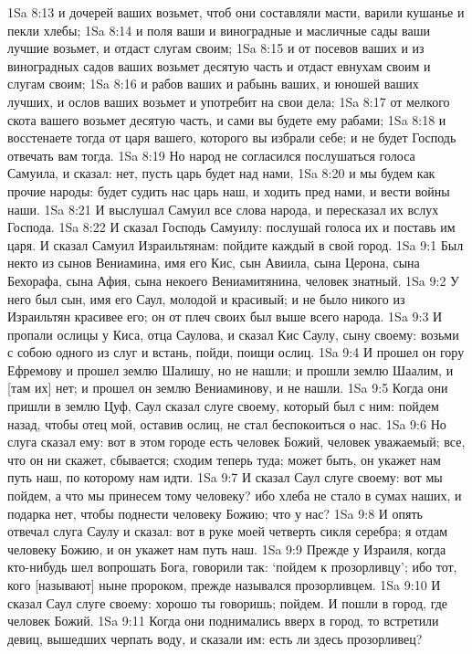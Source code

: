 1Sa 8:13  и дочерей ваших возьмет, чтоб они составляли масти, варили кушанье и пекли хлебы;
1Sa 8:14  и поля ваши и виноградные и масличные сады ваши лучшие возьмет, и отдаст слугам своим;
1Sa 8:15  и от посевов ваших и из виноградных садов ваших возьмет десятую часть и отдаст евнухам своим и слугам своим;
1Sa 8:16  и рабов ваших и рабынь ваших, и юношей ваших лучших, и ослов ваших возьмет и употребит на свои дела;
1Sa 8:17  от мелкого скота вашего возьмет десятую часть, и сами вы будете ему рабами;
1Sa 8:18  и восстенаете тогда от царя вашего, которого вы избрали себе; и не будет Господь отвечать вам тогда.
1Sa 8:19  Но народ не согласился послушаться голоса Самуила, и сказал: нет, пусть царь будет над нами,
1Sa 8:20  и мы будем как прочие народы: будет судить нас царь наш, и ходить пред нами, и вести войны наши.
1Sa 8:21  И выслушал Самуил все слова народа, и пересказал их вслух Господа.
1Sa 8:22  И сказал Господь Самуилу: послушай голоса их и поставь им царя. И сказал Самуил Израильтянам: пойдите каждый в свой город.
1Sa 9:1  Был некто из сынов Вениамина, имя его Кис, сын Авиила, сына Церона, сына Бехорафа, сына Афия, сына некоего Вениамитянина, человек знатный.
1Sa 9:2  У него был сын, имя его Саул, молодой и красивый; и не было никого из Израильтян красивее его; он от плеч своих был выше всего народа.
1Sa 9:3  И пропали ослицы у Киса, отца Саулова, и сказал Кис Саулу, сыну своему: возьми с собою одного из слуг и встань, пойди, поищи ослиц.
1Sa 9:4  И прошел он гору Ефремову и прошел землю Шалишу, но не нашли; и прошли землю Шаалим, и [там их] нет; и прошел он землю Вениаминову, и не нашли.
1Sa 9:5  Когда они пришли в землю Цуф, Саул сказал слуге своему, который был с ним: пойдем назад, чтобы отец мой, оставив ослиц, не стал беспокоиться о нас.
1Sa 9:6  Но слуга сказал ему: вот в этом городе есть человек Божий, человек уважаемый; все, что он ни скажет, сбывается; сходим теперь туда; может быть, он укажет нам путь наш, по которому нам идти.
1Sa 9:7  И сказал Саул слуге своему: вот мы пойдем, а что мы принесем тому человеку? ибо хлеба не стало в сумах наших, и подарка нет, чтобы поднести человеку Божию; что у нас?
1Sa 9:8  И опять отвечал слуга Саулу и сказал: вот в руке моей четверть сикля серебра; я отдам человеку Божию, и он укажет нам путь наш.
1Sa 9:9  Прежде у Израиля, когда кто-нибудь шел вопрошать Бога, говорили так: `пойдем к прозорливцу'; ибо тот, кого [называют] ныне пророком, прежде назывался прозорливцем.
1Sa 9:10  И сказал Саул слуге своему: хорошо ты говоришь; пойдем. И пошли в город, где человек Божий.
1Sa 9:11  Когда они поднимались вверх в город, то встретили девиц, вышедших черпать воду, и сказали им: есть ли здесь прозорливец?

